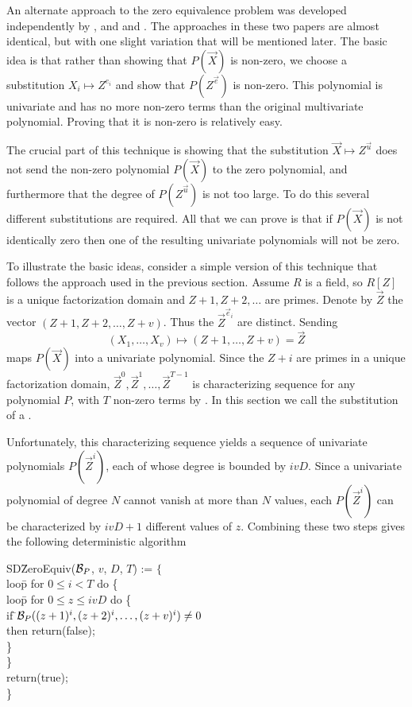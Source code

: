 An alternate approach to the zero equivalence problem was developed 
independently by {\Grigoriev}, {\Karpinski} and {\Singer} 
\cite{Grigorev1990-bj} and {\Zippel} \cite{Zippel1990-ab}.  The approaches in 
these two papers are almost 
identical, but with one slight variation that will be mentioned later.
The basic idea is that rather than showing that $P(\vec{X})$ is
non-zero, we choose a substitution $X_i \mapsto Z^{e_i}$ and show that
$P(Z^{\vec{e}})$ is non-zero.  This polynomial is univariate and has no
more non-zero terms than the original multivariate polynomial.
Proving that it is non-zero is relatively easy.

The crucial part of this technique is showing that the substitution
$\vec{X} \mapsto Z^{\vec{u}}$ does not send the non-zero polynomial
$P(\vec{X})$ to the zero polynomial, and furthermore that the degree
of $P(Z^{\vec{u}})$ is not too large.  To do this several different
substitutions are required.  All that we can prove is that if
$P(\vec{X})$ is not identically zero then one of the resulting
univariate polynomials will not be zero.

To illustrate the basic ideas, consider a simple version of this
technique that follows the approach used in the previous section.
Assume $R$ is a field, so $R[Z]$ is a unique factorization domain and
$Z+1, Z+2, \ldots$ are primes. Denote by $\vec{Z}$ the vector $(Z+1,
Z+2, \ldots, Z+v)$.  Thus the $\vec{Z}^{\vec{e}_i}$ are distinct.
Sending
\begin{equation}\label{Zero:LinearSubs:Eq}
(X_1, \ldots, X_v) \mapsto (Z+1, \ldots, Z+v) = \vec{Z}
\end{equation}
maps $P(\vec{X})$ into a univariate polynomial.  Since the $Z+i$ are
primes in a unique factorization domain, $\vec{Z}^0, \vec{Z}^1,
\ldots, \vec{Z}^{T-1}$ is characterizing sequence for any polynomial
$P$, with $T$ non-zero terms by .  In this
section we call the substitution of  a
.

Unfortunately, this characterizing sequence yields a sequence of
univariate polynomials $P(\vec{Z}^i)$, each of whose degree is bounded
by $ivD$.  Since a univariate polynomial of degree $N$ cannot vanish
at more than $N$ values, each $P(\vec{Z}^i)$ can be characterized by
$ivD+1$ different values of $z$.  Combining these two steps gives the
following deterministic algorithm

\begindsacode
SD\=ZeroEquiv(${\cal B}_P$, $v$, $D$, $T$) := $\{$\\
\>loo\=p for $0 \le i < T$ do \{ \\
\>\> loo\=p for $0 \le z \le ivD$ do \{ \\
\>\>\> if \=${\cal B}_P((z+1)^i, (z+2)^i, \ldots, (z+v)^i) \not= 0$ \\
\>\>\>\>then return(false); \\
\>\>\> \}\\
\>\> \}\\
\> return(true); \\
\> \}
\enddsacode

